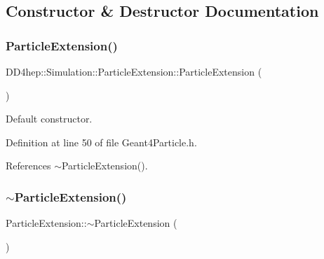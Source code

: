 \subsection{Constructor \& Destructor Documentation}
\hypertarget{class_d_d4hep_1_1_simulation_1_1_particle_extension_a6bd53f39e129dedd6a17a7e60c0c03af}{}\label{class_d_d4hep_1_1_simulation_1_1_particle_extension_a6bd53f39e129dedd6a17a7e60c0c03af} 
\subsubsection{\texorpdfstring{Particle\+Extension()}{ParticleExtension()}}
{\footnotesize\ttfamily D\+D4hep\+::\+Simulation\+::\+Particle\+Extension\+::\+Particle\+Extension (\begin{DoxyParamCaption}{ }\end{DoxyParamCaption})\hspace{0.3cm}{\ttfamily [inline]}}



Default constructor. 



Definition at line 50 of file Geant4\+Particle.\+h.



References $\sim$\+Particle\+Extension().

\hypertarget{class_d_d4hep_1_1_simulation_1_1_particle_extension_aed2fb52f3a28221b701ab44dee8ed576}{}\label{class_d_d4hep_1_1_simulation_1_1_particle_extension_aed2fb52f3a28221b701ab44dee8ed576} 
\subsubsection{\texorpdfstring{$\sim$\+Particle\+Extension()}{~ParticleExtension()}}
{\footnotesize\ttfamily Particle\+Extension\+::$\sim$\+Particle\+Extension (\begin{DoxyParamCaption}{ }\end{DoxyParamCaption})\hspace{0.3cm}{\ttfamily [virtual]}}



